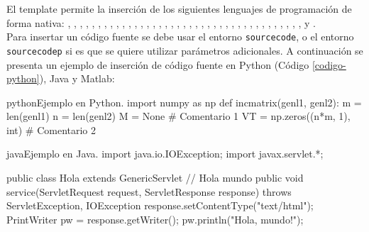	El template permite la inserción de los siguientes lenguajes de programación de forma nativa: , ,  , , , , , , , , , , , , , , , , , , , , , , , , , , , , , , , , , , , , ,  y . \\
	
	Para insertar un código fuente se debe usar el entorno \texttt{sourcecode}, o el entorno \texttt{sourcecodep} si es que se quiere utilizar parámetros adicionales. A continuación se presenta un ejemplo de inserción de código fuente en Python (Código \ref{codigo-python}), Java y Matlab:

\begin{sourcecode}[\label{codigo-python}]{python}{Ejemplo en Python.}
import numpy as np
def incmatrix(genl1, genl2):
	m = len(genl1)
	n = len(genl2)
	M = None # Comentario 1
	VT = np.zeros((n*m, 1), int) # Comentario 2
\end{sourcecode}

\begin{sourcecode}[]{java}{Ejemplo en Java.}
import java.io.IOException;
import javax.servlet.*;

public class Hola extends GenericServlet { // Hola mundo
	public void service(ServletRequest request, ServletResponse response)
	throws ServletException, IOException{
		response.setContentType("text/html");
		PrintWriter pw = response.getWriter();
		pw.println("Hola, mundo!");
	}
}
\end{sourcecode}

